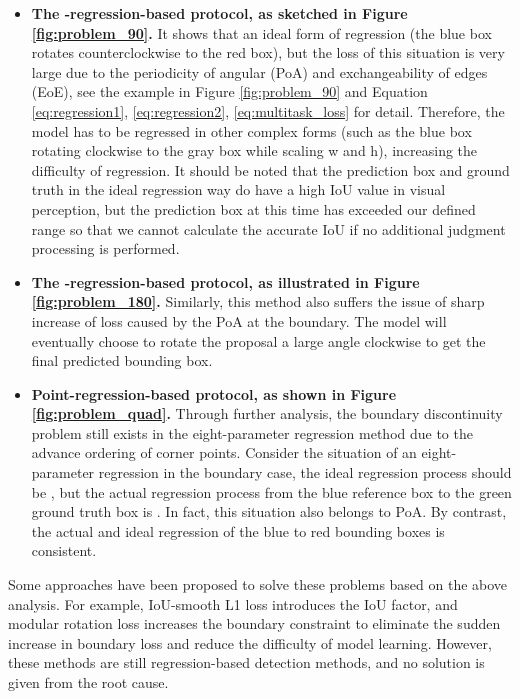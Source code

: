 \documentclass[10pt,journal,compsoc]{IEEEtran}
\begin{document}
\begin{itemize}
	\item \textbf{The -regression-based protocol, as sketched in Figure \ref{fig:problem_90}.} It shows that an ideal form of regression (the blue box rotates counterclockwise to the red box), but the loss of this situation is very large due to the periodicity of angular (PoA) and exchangeability of edges (EoE), see the example in Figure \ref{fig:problem_90} and Equation \ref{eq:regression1}, \ref{eq:regression2}, \ref{eq:multitask_loss} for detail. Therefore, the model has to be regressed in other complex forms (such as the blue box rotating clockwise to the gray box while scaling w and h), increasing the difficulty of regression. It should be noted that the prediction box and ground truth in the ideal regression way do have a high IoU value in visual perception, but the prediction box at this time has exceeded our defined range so that we cannot calculate the accurate IoU if no additional judgment processing is performed.
	
	\item \textbf{The -regression-based protocol, as illustrated in Figure \ref{fig:problem_180}.} Similarly, this method also suffers the issue of sharp increase of loss caused by the PoA at the boundary. The model will eventually choose to rotate the proposal a large angle clockwise to get the final predicted bounding box.
	
	\item \textbf{Point-regression-based protocol, as shown in Figure \ref{fig:problem_quad}.} Through further analysis, the boundary discontinuity problem still exists in the eight-parameter regression method due to the advance ordering of corner points. Consider the situation of an eight-parameter regression in the boundary case, the ideal regression process should be , but the actual regression process from the blue reference box to the green ground truth box is . In fact, this situation also belongs to PoA. By contrast, the actual and ideal regression of the blue to red bounding boxes is consistent.
\end{itemize}

Some approaches have been proposed to solve these problems based on the above analysis. For example, IoU-smooth L1 \cite{yang2019scrdet} loss introduces the IoU factor, and modular rotation loss \cite{qian2021learning} increases the boundary constraint to eliminate the sudden increase in boundary loss and reduce the difficulty of model learning. However, these methods are still regression-based detection methods, and no solution is given from the root cause.
	
\end{document}
